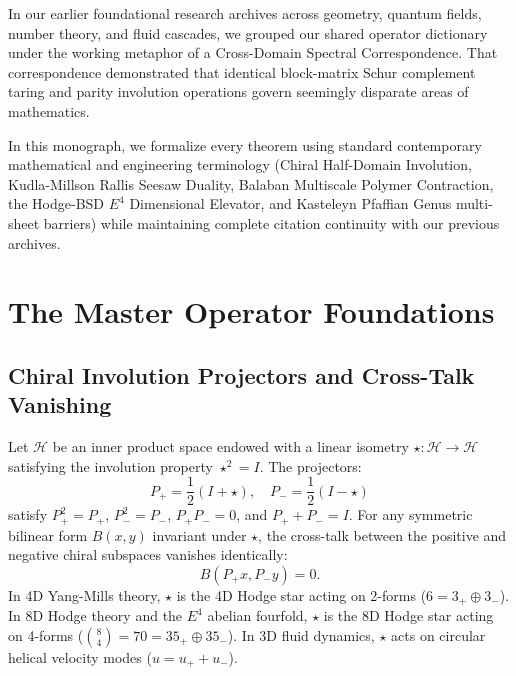 \documentclass[11pt,a4paper]{article}
\theoremstyle{definition}
\begin{document}
In our earlier foundational research archives across geometry, quantum fields, number theory, and fluid cascades, we grouped our shared operator dictionary under the working metaphor of a Cross-Domain Spectral Correspondence. That correspondence demonstrated that identical block-matrix Schur complement taring and parity involution operations govern seemingly disparate areas of mathematics.

In this monograph, we formalize every theorem using standard contemporary mathematical and engineering terminology (Chiral Half-Domain Involution, Kudla-Millson Rallis Seesaw Duality, Balaban Multiscale Polymer Contraction, the Hodge-BSD $E^4$ Dimensional Elevator, and Kasteleyn Pfaffian Genus multi-sheet barriers) while maintaining complete citation continuity with our previous archives.

\section{The Master Operator Foundations}

\subsection{Chiral Involution Projectors and Cross-Talk Vanishing}
Let $\mathcal{H}$ be an inner product space endowed with a linear isometry $\star : \mathcal{H} \to \mathcal{H}$ satisfying the involution property $\star^2 = I$. The projectors:
\begin{equation}
P_+ = \frac{1}{2}(I + \star), \quad P_- = \frac{1}{2}(I - \star)
\end{equation}
satisfy $P_+^2 = P_+$, $P_-^2 = P_-$, $P_+ P_- = 0$, and $P_+ + P_- = I$. For any symmetric bilinear form $B(x, y)$ invariant under $\star$, the cross-talk between the positive and negative chiral subspaces vanishes identically:
\begin{equation}
B(P_+ x, P_- y) = 0.
\end{equation}
In 4D Yang-Mills theory, $\star$ is the 4D Hodge star acting on 2-forms ($6 = 3_+ \oplus 3_-$). In 8D Hodge theory and the $E^4$ abelian fourfold, $\star$ is the 8D Hodge star acting on 4-forms ($\binom{8}{4} = 70 = 35_+ \oplus 35_-$). In 3D fluid dynamics, $\star$ acts on circular helical velocity modes ($u = u_+ + u_-$).
\end{document}
